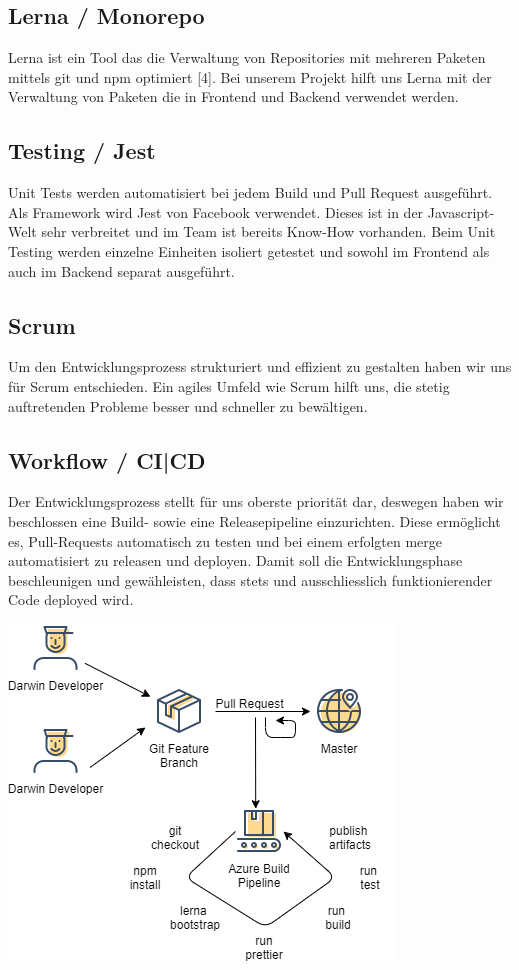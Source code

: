 \documentclass[11pt,a4paper,titlepage]{article}
\begin{document}
\subsection{Lerna / Monorepo}
Lerna ist ein Tool das die Verwaltung von Repositories mit mehreren Paketen mittels git und npm optimiert [4]. Bei unserem Projekt hilft uns Lerna mit der Verwaltung von Paketen die in Frontend und Backend verwendet werden.

\subsection{Testing / Jest}
Unit Tests werden automatisiert bei jedem Build und Pull Request ausgeführt.
Als Framework wird Jest von Facebook verwendet. Dieses ist in der Javascript-Welt sehr verbreitet und im Team ist bereits Know-How vorhanden.
Beim Unit Testing werden einzelne Einheiten isoliert getestet und sowohl im Frontend als auch im Backend separat ausgeführt.

\subsection{Scrum}
Um den Entwicklungsprozess strukturiert und effizient zu gestalten haben wir uns für Scrum entschieden. Ein agiles Umfeld wie Scrum hilft uns, die stetig auftretenden Probleme besser und schneller zu bewältigen.


\subsection{Workflow / CI|CD}
Der Entwicklungsprozess stellt für uns oberste priorität dar, deswegen haben wir beschlossen eine Build- sowie eine Releasepipeline einzurichten. Diese ermöglicht es, Pull-Requests automatisch zu testen und bei einem erfolgten merge automatisiert zu releasen und deployen.
Damit soll die Entwicklungsphase beschleunigen und gewähleisten, dass stets und ausschliesslich funktionierender Code deployed wird.

\includegraphics{workflow.png}
\end{document}
